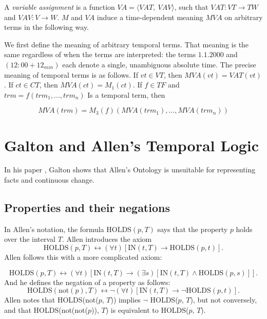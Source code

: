 A \textit{variable assignment} is a function $ VA = \langle VAT,\ VAV \rangle$, such that $VAT: VT \to TW$ and
$VAV: V \to W$. $M$ and $VA$ induce a time-dependent meaning $MVA$ on arbitrary terms in the following way.

We first define the meaning of arbitrary temporal terms. That meaning is the same regardless of when the terms are interpreted: the terms $1.1.2000$ and
$(12:00 + 12_{min})$ each denote a single, unambiguous absolute time. The precise
meaning of temporal terms is as follows. If $vt \in VT $, then $MVA (vt) = VAT (vt)$.
If $ct \in CT$, then $MVA (ct) = M_1(ct)$. If $f \in T F$ and $trm = f(trm_1, . . . , trm_n)$ Is a
temporal term, then

\[
	MVA(trm) = M_3(f)(MVA(trm_1), \dots, MVA(trm_n))
\]

\section{Galton and Allen's Temporal Logic}
In his paper \cite{galton2004}, Galton shows that Allen's Ontology is unsuitable for representing facts and continuous change.

\subsection{Properties and their negations}
In Allen's notation, the formula $\text{HOLDS}(p, T)$ says that the property $p$ holds over the interval $T$.
Allen introduces the axiom
\begin{equation}
	\text{HOLDS}(p, T) \leftrightarrow (\forall t) [\text{IN}(t, T) \to \text{HOLDS}(p, t)].
\end{equation}
Allen follows this with a more complicated axiom:

\begin{equation}
	\text{HOLDS}(p, T) \leftrightarrow (\forall t) [\text{IN}(t, T) \to (\exists s)[\text{IN}(t, T) \land \text{HOLDS}(p, s)]].
\end{equation}
And he defines the negation of a property as follows:
\begin{equation}
	\text{HOLDS}(\text{not}(p), T) \leftrightarrow \neg (\forall t) [\text{IN}(t, T) \to \neg \text{HOLDS}(p, t)].
\end{equation}
Allen notes that HOLDS(not($p$, $T$)) implies $\neg$ HOLDS($p$, $T$), but not conversely, and that HOLDS(not(not($p$)), $T$) is equivalent to HOLDS($p$, $T$).
